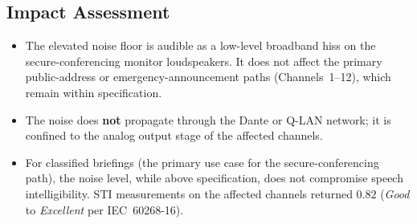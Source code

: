 \subsection{Impact Assessment}

\begin{itemize}[leftmargin=*, nosep, before=\vspace{4pt}, after=\vspace{0pt}]
  \item The elevated noise floor is audible as a low-level broadband hiss on the
        secure-conferencing monitor loudspeakers. It does not affect the primary
        public-address or emergency-announcement paths (Channels~1--12), which
        remain within specification.
  \item The noise does \textbf{not} propagate through the Dante or Q-LAN
        network; it is confined to the analog output stage of the affected
        channels.
  \item For classified briefings (the primary use case for the secure-conferencing
        path), the noise level, while above specification, does not compromise
        speech intelligibility. STI measurements on the affected channels returned
        $0.82$ (\textit{Good} to \textit{Excellent} per IEC~60268-16).
\end{itemize}

